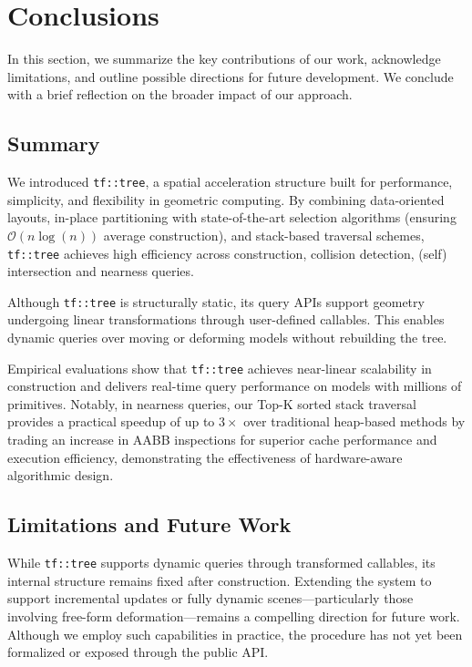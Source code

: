\section{Conclusions}

In this section, we summarize the key contributions of our
work, acknowledge limitations, and outline possible 
directions for future development. We conclude with a 
brief reflection on the broader impact of our approach.

\subsection{Summary}

We introduced \texttt{tf::tree}, a spatial acceleration 
structure built for performance, simplicity, and flexibility 
in geometric computing. By combining data-oriented layouts, 
in-place partitioning with state-of-the-art selection algorithms
(ensuring $\mathcal{O}(n\log(n))$ average construction), and 
stack-based traversal schemes, \texttt{tf::tree} achieves 
high efficiency across construction, collision detection, 
(self) intersection and nearness queries.

Although \texttt{tf::tree} is structurally static, its 
query APIs support geometry undergoing linear 
transformations through user-defined callables. This 
enables dynamic queries over moving or deforming models 
without rebuilding the tree.

Empirical evaluations show that \texttt{tf::tree} achieves
near-linear scalability in construction and delivers real-time
query performance on models with millions of primitives. Notably,
in nearness queries, our Top-K sorted stack traversal provides a
practical speedup of up to $3\times$ over traditional heap-based
methods by trading an increase in AABB inspections for superior
cache performance and execution efficiency, demonstrating the
effectiveness of hardware-aware algorithmic design.

\subsection{Limitations and Future Work}

While \texttt{tf::tree} supports dynamic queries through
transformed callables, its internal structure remains fixed
after construction. Extending the system to support
incremental updates or fully dynamic scenes—particularly
those involving free-form deformation—remains a compelling
direction for future work. Although we employ such
capabilities in practice, the procedure has not yet been
formalized or exposed through the public API.

